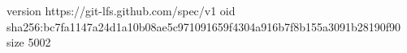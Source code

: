 version https://git-lfs.github.com/spec/v1
oid sha256:bc7fa1147a24d1a10b08ae5c971091659f4304a916b7f8b155a3091b28190f90
size 5002
